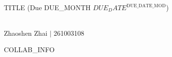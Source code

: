 \documentclass{article}
\begin{document}
    \begin{center}
        \large{TITLE (Due DUE_MONTH $DUE_DATE^\textrm{DUE_DATE_MOD}$)}\\\ \\
        \begin{minipage}{0.3\textwidth}
            \begin{center}
                \normalsize{Zhaoshen Zhai $|$ 261003108}
            \end{center}
        \end{minipage}
        \begin{minipage}{0.3\textwidth}
            \begin{center}
                \normalsize{COLLAB_INFO}
            \end{center}
        \end{minipage}
    \end{center}

    \begin{exercise}
        
    \end{exercise}
    \begin{solution}
        \TODO
    \end{solution}
\end{document}
